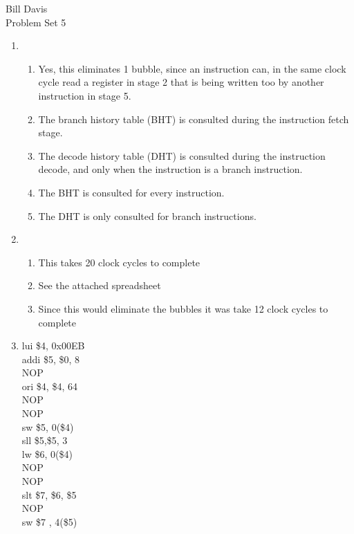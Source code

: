 \documentclass[11pt,fleqn]{article}
\begin{document}
\newcommand{\mbf}[1]{\mbox{{\bfseries #1}}}
\newcommand{\N}{\mbf{N}}
\renewcommand{\O}{\mbf{O}}

\noindent Bill Davis \\
 Problem Set 5

\begin{enumerate}
\item %
  \begin{enumerate}
  \item Yes, this eliminates 1 bubble, since an instruction can, in the same clock cycle read a register in stage 2 that is being written too by another instruction in stage 5.
  \item The branch history table (BHT) is consulted during the instruction fetch stage.
  \item The decode history table (DHT) is consulted during the instruction decode, and only when the instruction is a branch instruction. 
  \item The BHT is consulted for every instruction. 
  \item The DHT is only consulted for branch instructions.
  
  \end{enumerate}
\item %
  \begin{enumerate}
  \item This takes 20 clock cycles to complete
  \item See the attached spreadsheet 
  \item Since this would eliminate the bubbles it was take 12 clock cycles to complete
  
  \end{enumerate}

\item %
lui \$4, 0x00EB \\
addi \$5, \$0, 8 \\
NOP \\
ori \$4, \$4, 64 \\
NOP \\
NOP \\
sw \$5, 0(\$4) \\	
sll \$5,\$5, 3 \\
lw \$6, 0(\$4) \\
NOP \\ 
NOP \\
slt \$7, \$6, \$5 \\
NOP \\
sw \$7 , 4(\$5) \\




\end{enumerate}
\end{document}
